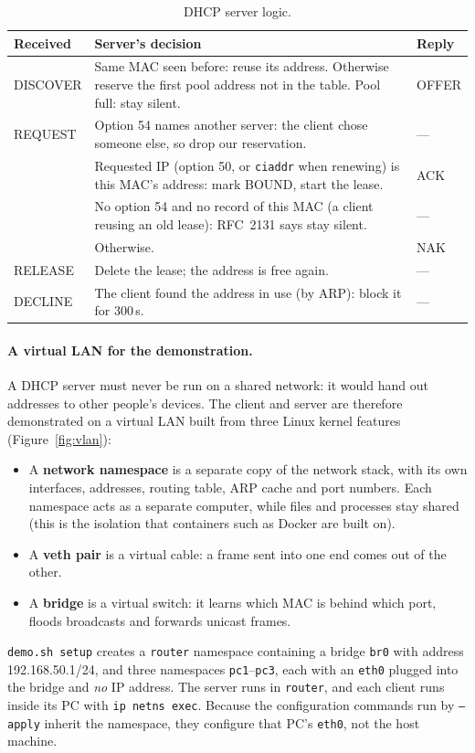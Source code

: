 \documentclass[11pt]{article}
\begin{document}
\begin{table}[H]
\centering
\small
\begin{tabular}{lp{9.2cm}l}
\toprule
\textbf{Received} & \textbf{Server's decision} & \textbf{Reply} \\
\midrule
DISCOVER & Same MAC seen before: reuse its address. Otherwise reserve the first pool
           address not in the table. Pool full: stay silent. & OFFER \\
REQUEST  & Option 54 names another server: the client chose someone else, so drop our
           reservation. & --- \\
         & Requested IP (option 50, or \texttt{ciaddr} when renewing) is this MAC's
           address: mark BOUND, start the lease. & ACK \\
         & No option 54 and no record of this MAC (a client reusing an old lease):
           RFC~2131 says stay silent. & --- \\
         & Otherwise. & NAK \\
RELEASE  & Delete the lease; the address is free again. & --- \\
DECLINE  & The client found the address in use (by ARP): block it for 300\,s. & --- \\
\bottomrule
\end{tabular}
\caption{DHCP server logic.}
\label{tab:serverlogic}
\end{table}

\paragraph{A virtual LAN for the demonstration.} A DHCP server must never be run on a
shared network: it would hand out addresses to other people's devices. The client and
server are therefore demonstrated on a virtual LAN built from three Linux kernel features
(Figure~\ref{fig:vlan}):
\begin{itemize}[leftmargin=1.6em,itemsep=0pt]
  \item A \textbf{network namespace} is a separate copy of the network stack, with its own
  interfaces, addresses, routing table, ARP cache and port numbers. Each namespace acts as
  a separate computer, while files and processes stay shared (this is the isolation that
  containers such as Docker are built on).
  \item A \textbf{veth pair} is a virtual cable: a frame sent into one end comes out of the
  other.
  \item A \textbf{bridge} is a virtual switch: it learns which MAC is behind which port,
  floods broadcasts and forwards unicast frames.
\end{itemize}
\texttt{demo.sh setup} creates a \texttt{router} namespace containing a bridge
\texttt{br0} with address 192.168.50.1/24, and three namespaces \texttt{pc1}--\texttt{pc3},
each with an \texttt{eth0} plugged into the bridge and \emph{no} IP address.
The server runs in \texttt{router}, and each client runs inside its PC with
\texttt{ip netns exec}. Because the configuration commands run by \texttt{--apply} inherit
the namespace, they configure that PC's \texttt{eth0}, not the host machine.
\end{document}
